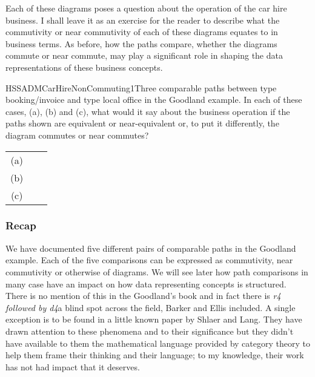 Each of these diagrams poses a question about the operation of the car hire business.
I shall leave it as
an exercise for the reader to describe what the commutivity or near commutivity of each of these diagrams equates to in business terms.
As before, how the paths compare, whether the diagrams commute or near commute, may play a significant role in  shaping the data representations of these business concepts.

\begin{erboxedFigure}{H}{SSADMCarHireNonCommuting1}{Three comparable paths between type booking/invoice and type local office in the Goodland example. 
In each of these cases, (a), (b) and (c), what  would it say about the business operation if the paths 
shown are equivalent or near-equivalent or, to put it differently, the diagram commutes or near commutes?
}
\begin{tabular}{c p{1cm} c}
(a) &&  \\
(b) &&  \\
(c) && 
\end{tabular}
\end{erboxedFigure}

\subsubsection{Recap}
We have documented five different pairs of comparable paths in the Goodland example. 
Each of the five comparisons can be expressed as commutivity, near commutivity or otherwise of diagrams. 
We will see later how path comparisons in many case have an impact on how data representing concepts is structured. There is no mention of this in the Goodland's book and in fact there is \textit{r4 followed by d4}a blind spot across the field, Barker and Ellis included. 
A single exception is to be found  in a little known paper by Shlaer and Lang. 
They have drawn attention to these phenomena  and to their significance but they didn't have  available to them the mathematical language provided by category theory to help them frame their thinking and their language; to my knowledge, their work has not had impact that it deserves. 